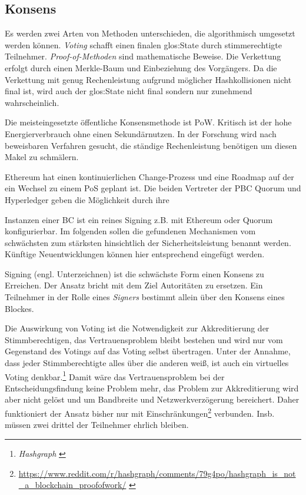 \subsection{Konsens}\label{krit:consensus}

Es werden zwei Arten von Methoden unterschieden, die algorithmisch umgesetzt werden können.
\emph{Voting} schafft einen finalen \gls{glos:State} durch stimmerechtigte Teilnehmer.
\emph{Proof-of-Methoden} sind mathematische Beweise.
Die Verkettung erfolgt durch einen Merkle-Baum und Einbeziehung des Vorgängers.
Da die Verkettung mit genug Rechenleistung aufgrund möglicher Hashkollisionen nicht final ist, wird auch der \gls{glos:State} nicht final sondern nur zunehmend wahrscheinlich.

Die meisteingesetzte öffentliche Konsensmethode ist \gls{PoW}. 
Kritisch ist der hohe Energierverbrauch ohne einen Sekundärnutzen.
In der Forschung wird nach beweisbaren Verfahren gesucht, die ständige Rechenleistung benötigen um diesen Makel zu schmälern.

Ethereum hat einen kontinuierlichen Change-Prozess und eine Roadmap auf der ein Wechsel zu einem \gls{PoS} geplant ist.
Die beiden Vertreter der \gls{PBC} Quorum und Hyperledger geben die Möglichkeit durch ihre 

Instanzen einer \gls{BC} ist ein reines Signing z.B. mit Ethereum oder Quorum konfigurierbar.
Im folgenden sollen die gefundenen Mechanismen vom schwächsten zum stärksten hinsichtlich der Sicherheitsleistung benannt werden.
Künftige Neuentwicklungen können hier entsprechend eingefügt werden.

Signing (engl. Unterzeichnen) ist die schwächste Form einen Konsens zu Erreichen.
Der Ansatz bricht mit dem Ziel Autoritäten zu ersetzen.
Ein Teilnehmer in der Rolle eines \emph{Signers} bestimmt allein über den Konsens eines Blockes.

Die Auswirkung von Voting ist die Notwendigkeit zur Akkreditierung der Stimmberechtigen, das Vertrauensproblem bleibt bestehen und wird nur vom Gegenstand des Votings auf das Voting selbst übertragen. Unter der Annahme, dass jeder Stimmberechtigte alles über die anderen weiß, ist auch ein virtuelles Voting denkbar.\footnote{\emph{Hashgraph} \autocite{p:hashgraph}} Damit wäre das Vertrauensproblem bei der Entscheidungsfindung keine Problem mehr, das Problem zur Akkreditierung wird aber nicht gelöst und um Bandbreite und Netzwerkverzögerung bereichert. Daher funktioniert der Ansatz bisher nur mit Einschränkungen\footnote{\url{https://www.reddit.com/r/hashgraph/comments/79g4po/hashgraph_is_not_a_blockchain_proofofwork/}  \autocite{w:reddit}} verbunden. Insb. müssen zwei drittel der Teilnehmer ehrlich bleiben.

